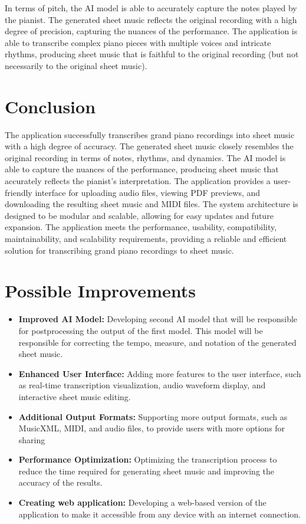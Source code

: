 \documentclass{article}
\begin{document}
In terms of pitch, the AI model is able to accurately capture the notes played by the pianist. The generated sheet music reflects the original recording with a high degree of precision, capturing the nuances of the performance. The application is able to transcribe complex piano pieces with multiple voices and intricate rhythms, producing sheet music that is faithful to the original recording (but not necessarily to the original sheet music).

\section{Conclusion}
The application successfully transcribes grand piano recordings into sheet music with a high degree of accuracy. The generated sheet music closely resembles the original recording in terms of notes, rhythms, and dynamics. The AI model is able to capture the nuances of the performance, producing sheet music that accurately reflects the pianist's interpretation. The application provides a user-friendly interface for uploading audio files, viewing PDF previews, and downloading the resulting sheet music and MIDI files. The system architecture is designed to be modular and scalable, allowing for easy updates and future expansion. The application meets the performance, usability, compatibility, maintainability, and scalability requirements, providing a reliable and efficient solution for transcribing grand piano recordings to sheet music.

\FloatBarrier
\section{Possible Improvements}
\begin{itemize}
    \item \textbf{Improved AI Model:} Developing second AI model that will be responsible for postprocessing the output of the first model. This model will be responsible for correcting the tempo, measure, and notation of the generated sheet music.
    \item \textbf{Enhanced User Interface:} Adding more features to the user interface, such as real-time transcription visualization, audio waveform display, and interactive sheet music editing.
    \item \textbf{Additional Output Formats:} Supporting more output formats, such as MusicXML, MIDI, and audio files, to provide users with more options for sharing
    \item \textbf{Performance Optimization:} Optimizing the transcription process to reduce the time required for generating sheet music and improving the accuracy of the results.
    \item \textbf{Creating web application:} Developing a web-based version of the application to make it accessible from any device with an internet connection.
\end{itemize}
\end{document}
